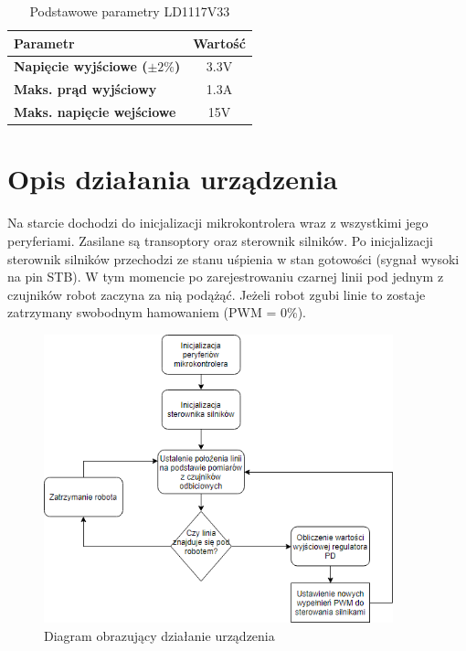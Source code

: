 \documentclass[10pt, a4paper]{article}
\begin{document}
\begin{table}[H]
	\centering
	\begin{tabular}{|l|c|} \hline
		\textbf{Parametr} & Wartość \\
		\hline
		\hline  \textbf{Napięcie wyjściowe ($\pm 2\%$)}& 3.3V\\\hline
		\textbf{Maks. prąd wyjściowy} & 1.3A\\
		\hline
		\textbf{Maks. napięcie wejściowe} & 15V\\
		\hline
	\end{tabular}
	\caption{Podstawowe parametry LD1117V33}
	\label{tab:LD1117V33}
\end{table}
\section{Opis działania urządzenia}
	Na starcie dochodzi do inicjalizacji mikrokontrolera wraz z wszystkimi jego peryferiami. Zasilane są transoptory oraz sterownik silników. Po inicjalizacji sterownik silników przechodzi ze stanu uśpienia w stan gotowości (sygnał wysoki na pin STB). W tym momencie po zarejestrowaniu czarnej linii pod jednym z czujników robot zaczyna za nią podążąć. Jeżeli robot zgubi linie to zostaje zatrzymany swobodnym hamowaniem (PWM = 0\%). 
\begin{figure}[H]
	\centering
	\includegraphics[width=0.9\textwidth]{flowchart.png}
	\caption{Diagram obrazujący działanie urządzenia}
	\label{fig:FlowChart}
\end{figure}
	
\end{document}
